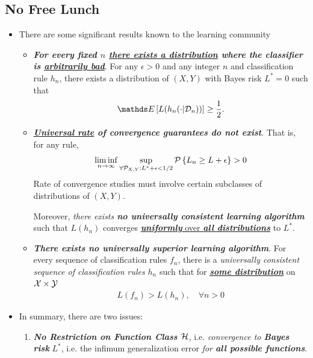 \documentclass[11pt]{article}
\begin{document}
\subsection{No Free Lunch}
\begin{itemize}
\item \begin{remark} 
There are some significant results known to the learning community
\begin{itemize}
\item \emph{\textbf{For every fixed $n$ \underline{there exists a distribution} where the classifier is \underline{arbitrarily bad}}}. For any $\epsilon > 0$ and any integer $n$ and classification rule $h_n$, there exists a distribution of $(X, Y)$ with Bayes risk $L^{*} = 0$ such that
\begin{align*}
\E{}{L(h_n(\cdot|\cD_n))} \ge \frac{1}{2}.
\end{align*}

\item \emph{\textbf{\underline{Universal rate} of convergence guarantees do not exist}}. 
That is, for any rule,
\begin{align*}
\liminf\limits_{n \rightarrow \infty} \sup_{\forall {\mathcal P}_{X, Y}: L^{*} + \epsilon < 1/2}{\mathcal P}\left\{L_n \ge L + \epsilon\right\} > 0
\end{align*} 
Rate of convergence studies must involve certain subclasses of distributions of $(X, Y)$. 

Moreover, \emph{there exists \textbf{no universally consistent learning algorithm}} such that $L(h_n)$ converges \underline{\emph{\textbf{uniformly}} over \emph{\textbf{all distributions}}} to $L^{*}$.

\item \emph{\textbf{There exists no universally superior learning algorithm}}. For every sequence of classification rules $f_n$, there is a \emph{universally consistent
sequence of classification rules} $h_n$ such that for \underline{\emph{\textbf{some distribution}}} on ${\mathcal X} \times {\mathcal Y}$
\begin{align*}
L(f_n) > L(h_n), \quad \forall n >0
\end{align*}
\end{itemize}
\end{remark}

\item \begin{remark} In summary, there are two issues:
\begin{enumerate}
\item \emph{\textbf{No Restriction on Function Class ${\mathcal H}$}}, i.e. \emph{convergence to \textbf{Bayes risk}} $L^{*}$, i.e. the infimum generalization error \emph{for \textbf{all possible functions}}.


\end{enumerate}
\end{remark}
\end{itemize}
\end{document}
